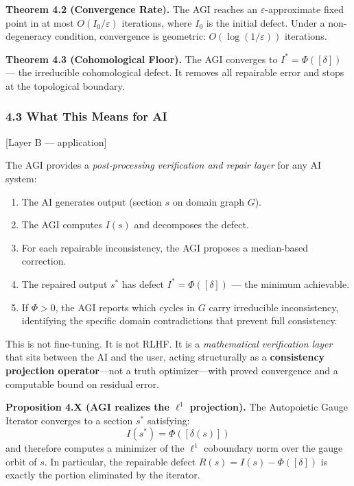\documentclass[
]{article}
\providecommand{\tightlist}{%
  \setlength{\itemsep}{0pt}\setlength{\parskip}{0pt}}
\begin{document}
\textbf{Theorem 4.2 (Convergence Rate).} The AGI reaches an
\(\varepsilon\)-approximate fixed point in at most
\(O(I_0 / \varepsilon)\) iterations, where \(I_0\) is the initial
defect. Under a non-degeneracy condition, convergence is geometric:
\(O(\log(1/\varepsilon))\) iterations.

\textbf{Theorem 4.3 (Cohomological Floor).} The AGI converges to
\(I^* = \Phi([\delta])\) --- the irreducible cohomological defect. It
removes all repairable error and stops at the topological boundary.

\subsubsection{4.3 What This Means for
AI}\label{what-this-means-for-ai-1}

{[}Layer B --- application{]}

The AGI provides a \emph{post-processing verification and repair layer}
for any AI system:

\begin{enumerate}
\def\labelenumi{\arabic{enumi}.}
\tightlist
\item
  The AI generates output (section \(s\) on domain graph \(G\)).
\item
  The AGI computes \(I(s)\) and decomposes the defect.
\item
  For each repairable inconsistency, the AGI proposes a median-based
  correction.
\item
  The repaired output \(s^*\) has defect \(I^* = \Phi([\delta])\) ---
  the minimum achievable.
\item
  If \(\Phi > 0\), the AGI reports which cycles in \(G\) carry
  irreducible inconsistency, identifying the specific domain
  contradictions that prevent full consistency.
\end{enumerate}

This is not fine-tuning. It is not RLHF. It is a \emph{mathematical
verification layer} that sits between the AI and the user, acting
structurally as a \textbf{consistency projection operator}---not a truth
optimizer---with proved convergence and a computable bound on residual
error.

\textbf{Proposition 4.X (AGI realizes the \(\ell^1\) projection).} The
Autopoietic Gauge Iterator converges to a section \(s^*\) satisfying:
\[ I(s^*) = \Phi([\delta(s)]) \] and therefore computes a minimizer of
the \(\ell^1\) coboundary norm over the gauge orbit of \(s\). In
particular, the repairable defect \(R(s) = I(s) - \Phi([\delta])\) is
exactly the portion eliminated by the iterator.
\end{document}
